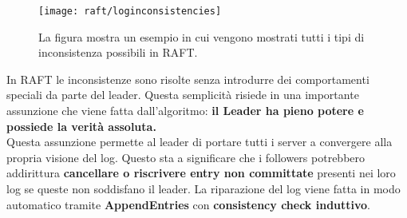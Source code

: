   \begin{figure}[H]
    \centering
    \texttt{[image: raft/loginconsistencies]}
    \caption[inconsistency]{La figura mostra un esempio in cui vengono mostrati tutti i tipi di inconsistenza possibili in RAFT.}
    \label{fig:figure9}
  \end{figure}
  In RAFT le inconsistenze sono risolte senza introdurre dei comportamenti speciali da parte del leader. Questa semplicità risiede in una importante assunzione che viene fatta dall'algoritmo: \textbf{il Leader ha pieno potere e possiede la verità assoluta.}\\
  Questa assunzione permette al leader di portare tutti i server a convergere alla propria visione del log. Questo sta a significare che i followers potrebbero addirittura \textbf{cancellare o riscrivere entry non committate} presenti nei loro log se queste non soddisfano il leader. La riparazione del log viene fatta in modo automatico tramite \textbf{AppendEntries} con \textbf{consistency check induttivo}.